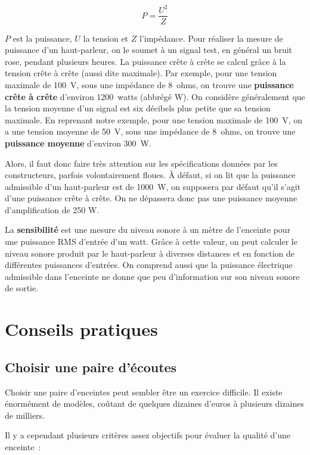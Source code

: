 \documentclass[
  letterpaper,
  DIV=11,
  numbers=noendperiod]{scrreprt}
\begin{document}
\[ P =\frac {U^2}{Z} \]

\(P\) est la puissance, \(U\) la tension et \(Z\) l'impédance. Pour
réaliser la mesure de puissance d'un haut-parleur, on le soumet à un
signal test, en général un bruit rose, pendant plusieurs heures. La
puissance crête à crête se calcul grâce à la tension crête à crête
(aussi dite maximale). Par exemple, pour une tension maximale de 100~V,
sous une impédance de 8~ohms, on trouve une \textbf{puissance crête à
crête} d'environ 1200~watts (abbrégé W). On considère généralement que
la tension moyenne d'un signal est six décibels plus petite que sa
tension maximale. En reprenant notre exemple, pour une tension maximale
de 100~V, on a une tension moyenne de 50~V, sous une impédance de
8~ohms, on trouve une \textbf{puissance moyenne} d'environ 300~W.

Alors, il faut donc faire très attention sur les spécifications données
par les constructeurs, parfois volontairement floues. À défaut, si on
lit que la puissance admissible d'un haut-parleur est de 1000~W, on
supposera par défaut qu'il s'agit d'une puissance crête à crête. On ne
dépassera donc pas une puissance moyenne d'amplification de 250 W.

La \textbf{sensibilité} est une mesure du niveau sonore à un mètre de
l'enceinte pour une puissance RMS d'entrée d'un watt. Grâce à cette
valeur, on peut calculer le niveau sonore produit par le haut-parleur à
diverses distances et en fonction de différentes puissances d'entrées.
On comprend aussi que la puissance électrique admissible dans l'enceinte
ne donne que peu d'information sur son niveau sonore de sortie.

\hypertarget{conseils-pratiques}{%
\section{Conseils pratiques}\label{conseils-pratiques}}

\hypertarget{choisir-une-paire-duxe9coutes}{%
\subsection{Choisir une paire
d'écoutes}\label{choisir-une-paire-duxe9coutes}}

Choisir une paire d'enceintes peut sembler être un exercice difficile.
Il existe énormément de modèles, coûtant de quelques dizaines d'euros à
plusieurs dizaines de milliers.

Il y a cependant plusieurs critères assez objectifs pour évaluer la
qualité d'une enceinte~:
\end{document}
